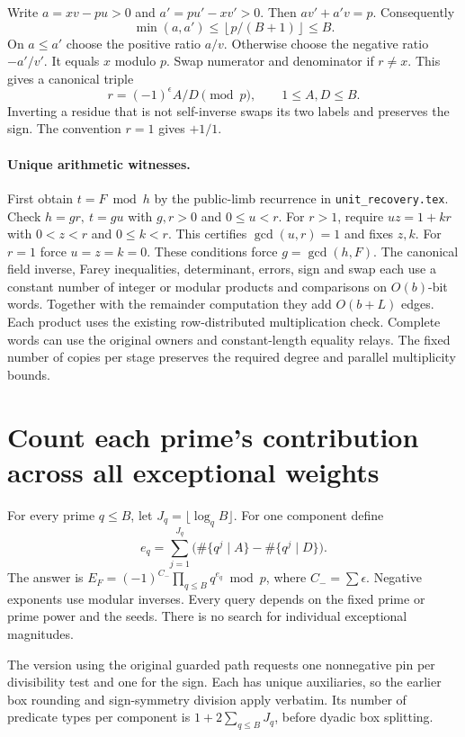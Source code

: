 \documentclass[11pt]{article}
\begin{document}
Write $a=xv-pu>0$ and $a'=pu'-xv'>0$. Then
$av'+a'v=p$. Consequently
\[
    \min(a,a')\le\left\lfloor p/(B+1)\right\rfloor\le B .
\]
On $a\le a'$ choose the positive ratio $a/v$. Otherwise choose the
negative ratio $-a'/v'$. It equals $x$ modulo $p$. Swap numerator and
denominator if $r\ne x$. This gives a canonical triple
\[
        r=(-1)^\epsilon A/D\pmod p,\qquad 1\le A,D\le B .
\]
Inverting a residue that is not self-inverse swaps its two labels and
preserves the sign. The convention $r=1$ gives $+1/1$.

\paragraph{Unique arithmetic witnesses.}
First obtain $t=F\bmod h$ by the public-limb recurrence in
\texttt{unit\_recovery.tex}. Check $h=gr,\ t=gu$ with $g,r>0$ and
$0\le u<r$. For $r>1$, require $uz=1+kr$ with $0<z<r$ and
$0\le k<r$. This certifies $\gcd(u,r)=1$ and fixes $z,k$.
For $r=1$ force $u=z=k=0$. These conditions force $g=\gcd(h,F)$.
The canonical field inverse, Farey inequalities, determinant,
errors, sign and swap each use a constant number of integer or
modular products and comparisons on $O(b)$-bit words. Together with
the remainder computation they add $O(b+L)$ edges. Each product uses
the existing row-distributed multiplication check. Complete words
can use the original owners and constant-length equality relays.
The fixed number of copies per stage preserves the required degree
and parallel multiplicity bounds.

\section{Count each prime's contribution across all exceptional weights}
For every prime $q\le B$, let $J_q=\lfloor\log_q B\rfloor$. For one
component define
\[
  e_q=\sum_{j=1}^{J_q}\bigl(\#\{q^j\mid A\}-\#\{q^j\mid D\}\bigr).
\]
The answer is $E_F=(-1)^{C_-}\prod_{q\le B}q^{e_q}\bmod p$, where
$C_-=\sum\epsilon$. Negative exponents use modular inverses.
Every query depends on the fixed prime or prime power and the seeds.
There is no search for individual exceptional magnitudes.

The version using the original guarded path requests one nonnegative
pin per divisibility test and one for the sign. Each has unique
auxiliaries, so the earlier box rounding and sign-symmetry division
apply verbatim. Its number of predicate types per component is
$1+2\sum_{q\le B}J_q$, before dyadic box splitting.
\end{document}
